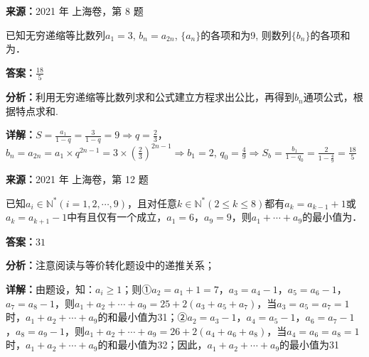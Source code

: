 \begin{question}[points=5]
\textbf{来源：}2021 年 上海卷，第 8 题\par
已知无穷递缩等比数列$a_1=3$, $b_n=a_{2n}$, $\{a_n\}$的各项和为9, 则数列$\{b_n\}$的各项和为．
\fillin[{$\frac{18}{5}$}]
\begin{solution}
\textbf{答案：}$\frac{18}{5}$

\textbf{分析：}利用无穷递缩等比数列求和公式建立方程求出公比，再得到$b_n$通项公式，根据特点求和.

\textbf{详解：}$S=\frac{a_1}{1-q}=\frac{3}{1-q}=9\Rightarrow q=\frac{2}{3}$，$b_n=a_{2n}=a_1\times q^{2n-1}=3\times (\frac{2}{3})^{2n-1}\Rightarrow b_1=2$, $q_0=\frac{4}{9}\Rightarrow S_b=\frac{b_1}{1-q_0}=\frac{2}{1-\frac{4}{9}}=\frac{18}{5}$
\end{solution}
\end{question}

\begin{question}[points=5]
\textbf{来源：}2021 年 上海卷，第 12 题\par
已知$a_i\in\mathbb{N}^* (i=1,2,\cdots,9)$，且对任意$k\in\mathbb{N}^* (2\le k\le 8)$都有$a_k=a_{k-1}+1$或$a_k=a_{k+1}-1$中有且仅有一个成立，$a_1=6$，$a_9=9$，则$a_1+\cdots+a_9$的最小值为．
\fillin[{$31$}]
\begin{solution}
\textbf{答案：}$31$

\textbf{分析：}注意阅读与等价转化题设中的递推关系；

\textbf{详解：}由题设，知：$a_i\ge 1$；则①$a_2=a_1+1=7$，$a_3=a_4-1$，$a_5=a_6-1$，$a_7=a_8-1$，则$a_1+a_2+\cdots+a_9=25+2(a_3+a_5+a_7)$，当$a_3=a_5=a_7=1$时，$a_1+a_2+\cdots+a_9$的和最小值为31；②$a_2=a_3-1$，$a_4=a_5-1$，$a_6=a_7-1$，$a_8=a_9-1$，则$a_1+a_2+\cdots+a_9=26+2(a_4+a_6+a_8)$，当$a_4=a_6=a_8=1$时，$a_1+a_2+\cdots+a_9$的和最小值为32；因此，$a_1+a_2+\cdots+a_9$的最小值为31
\end{solution}
\end{question}

